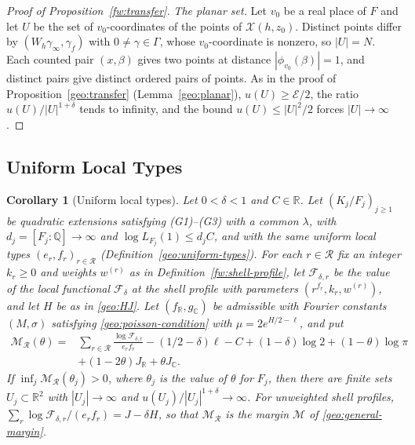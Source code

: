 \documentclass[11pt]{amsart}
\numberwithin{equation}{section}
\newtheorem{corollary}[equation]{Corollary}
\theoremstyle{definition}
\theoremstyle{remark}
\newcommand{\Q}{\mathbb Q}
\newcommand{\R}{\mathbb R}
\newcommand{\C}{\mathbb C}
\begin{document}
\begin{proof}[Proof of Proposition~\ref{fw:transfer}]
\emph{The planar set.} Let $v_0$ be a real place of $F$ and let $U$ be
the set of $v_0$-coordinates of the points of $\mathcal X(h,z_0)$.
Distinct points differ by $(W_h\gamma_\infty,\gamma_f)$ with
$0\ne\gamma\in\Gamma$, whose $v_0$-coordinate is nonzero, so $|U|=N$.
Each counted pair $(x,\beta)$ gives two points at distance
$|\phi_{v_0}(\beta)|=1$, and distinct pairs give distinct ordered
pairs of points. As in the proof of Proposition~\ref{geo:transfer}
(Lemma~\ref{geo:planar}), $u(U)\ge\mathcal E/2$, the ratio
$u(U)/|U|^{1+\delta}$ tends to infinity, and the bound $u(U)\le|U|^2/2$
forces $|U|\to\infty$.
\end{proof}

\subsection{Uniform Local Types}

\begin{corollary}[Uniform local types]\label{fw:uniform-types}
Let $0<\delta<1$ and $C\in\R$. Let $(K_j/F_j)_{j\ge1}$ be quadratic
extensions satisfying (G1)--(G3) with a common $\lambda$, with
$d_j=[F_j:\Q]\to\infty$ and $\log L_{F_j}(1)\le d_jC$, and with the same
uniform local types $(e_r,f_r)_{r\in\mathcal R}$
(Definition~\ref{geo:uniform-types}). For each $r\in\mathcal R$ fix an
integer $k_r\ge0$ and weights $w^{(r)}$ as in
Definition~\ref{fw:shell-profile}, let $\mathcal F_{\delta,r}$ be the
value of the local functional $\mathcal F_\delta$ at the shell profile
with parameters $(r^{f_r},k_r,w^{(r)})$, and let $H$ be as in
\eqref{geo:HJ}. Let $(f_\R,g_\C)$ be admissible with Fourier constants
$(M,\sigma)$ satisfying \eqref{geo:poisson-condition} with
$\mu=2e^{H/2-\ell}$, and put
\[
 \begin{split}
 \mathcal M_{\mathcal R}(\theta)={}&
 \sum_{r\in\mathcal R}\frac{\log\mathcal F_{\delta,r}}{e_rf_r}
 -(1/2-\delta)\ell-C+(1-\delta)\log2+(1-\theta)\log\pi\\
 &+(1-2\theta)J_\R+\theta J_\C .
 \end{split}
\]
If $\inf_j\mathcal M_{\mathcal R}(\theta_j)>0$, where $\theta_j$ is the
value of $\theta$ for $F_j$, then there are finite sets
$U_j\subset\R^2$ with $|U_j|\to\infty$ and
$u(U_j)/|U_j|^{1+\delta}\to\infty$. For unweighted shell profiles,
$\sum_r\log\mathcal F_{\delta,r}/(e_rf_r)=J-\delta H$, so that
$\mathcal M_{\mathcal R}$ is the margin $\mathcal M$ of
\eqref{geo:general-margin}.
\end{corollary}
\end{document}

